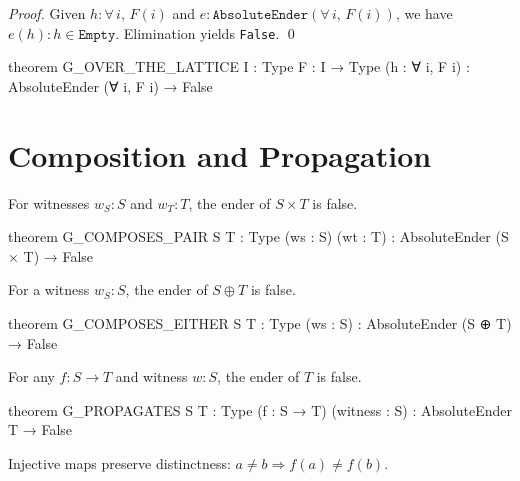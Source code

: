 \begin{proof}
Given $h : \forall\, i,\, F(i)$ and $e : \texttt{AbsoluteEnder}(\forall\, i,\, F(i))$, we have $e(h) : h \in \texttt{Empty}$. Elimination yields \texttt{False}. \qed
\end{proof}

\begin{leancode}
theorem G_OVER_THE_LATTICE {I : Type} {F : I → Type}
    (h : ∀ i, F i) :
    AbsoluteEnder (∀ i, F i) → False
\end{leancode}

\section{Composition and Propagation}

\begin{theorem}\label{thm:product}
For witnesses $w_S : S$ and $w_T : T$, the ender of $S \times T$ is false.
\end{theorem}

\begin{leancode}
theorem G_COMPOSES_PAIR {S T : Type} (ws : S) (wt : T) :
    AbsoluteEnder (S × T) → False
\end{leancode}

\begin{theorem}\label{thm:coproduct}
For a witness $w_S : S$, the ender of $S \oplus T$ is false.
\end{theorem}

\begin{leancode}
theorem G_COMPOSES_EITHER {S T : Type} (ws : S) :
    AbsoluteEnder (S ⊕ T) → False
\end{leancode}

\begin{theorem}\label{thm:propagation}
For any $f : S \to T$ and witness $w : S$, the ender of $T$ is false.
\end{theorem}

\begin{leancode}
theorem G_PROPAGATES {S T : Type} (f : S → T) (witness : S) :
    AbsoluteEnder T → False
\end{leancode}

\begin{theorem}\label{thm:conservation}
Injective maps preserve distinctness: $a \neq b \Rightarrow f(a) \neq f(b)$.
\end{theorem}

